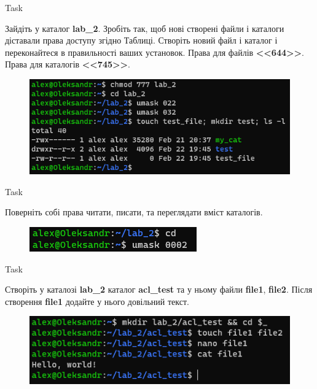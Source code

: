 \documentclass[a4paper,12pt]{article}
\newcommand{\RomanNumeralCaps}[1]{\MakeUppercase{\romannumeral #1}}
\begin{document}
    \begin{center}
        \Large{Task \RomanNumeralCaps{13}}
    \end{center}
    Зайдіть у каталог \textbf{lab\_2}. Зробіть так, щоб нові створені файли і каталоги діставали права доступу згідно Таблиці. Створіть новий файл і каталог і переконайтеся в
    правильності ваших установок. Права для файлів \textbf{<<644>>}. Права для каталогів \textbf{<<745>>}.
    \begin{figure}[h!]
        \begin{minipage}[h]{1\linewidth}
            \centering
            \includegraphics[width=0.6\linewidth]{Prt sc/Figure_13.png}  
        \end{minipage}
    \end{figure}

\newpage
    \begin{center}
        \Large{Task \RomanNumeralCaps{14}}
    \end{center}
    Поверніть собі права читати, писати, та переглядати вміст каталогів.
    \begin{figure}[h!]
        \begin{minipage}[h]{1\linewidth}
            \centering
            \includegraphics[width=0.6\linewidth]{Prt sc/Figure_14.png}  
        \end{minipage}
    \end{figure}

    \begin{center}
        \Large{Task \RomanNumeralCaps{15}}
    \end{center}
    Створіть у каталозі \textbf{lab\_2} каталог \textbf{acl\_test} та у ньому файли \textbf{file1}, \textbf{file2}. Після створення \textbf{file1} додайте у 
    нього довільний текст.
    \begin{figure}[h!]
        \begin{minipage}[h]{1\linewidth}
            \centering
            \includegraphics[width=0.6\linewidth]{Prt sc/Figure_15.png}  
        \end{minipage}
    \end{figure}
\end{document}
